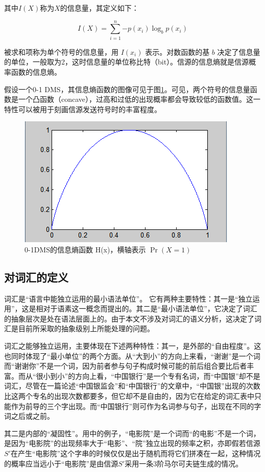 \documentclass[UTF8]{ctexart}
\begin{document}
其中$I(X)$称为$X$的信息量，其定义如下：

\begin{equation}
I(X) = \sum_{i=1}^{n}{-p(x_i) \log_b{p(x_i)}}
\end{equation}

被求和项称为单个符号的信息量，用 $I(x_i)$ 表示。对数函数的基 $b$ 决定了信息量的单位，一般取为2，这时信息量的单位称比特（bit）。信源的信息熵就是信源概率函数的信息熵。

假设一个0-1 DMS，其信息熵函数的图像可见于图\ref{fig_entropy_function}。可见，两个符号的信息量函数是一个凸函数（concave），过高和过低的出现概率都会导致较低的函数值。这一特性可以被用于刻画信源发送符号时的丰富程度。

\begin{figure}
\center
\includegraphics[width=0.6 \textwidth]{entropy_function.png}
\caption{0-1DMS的信息熵函数 H(x)，横轴表示 $\Pr(X=1)$}
\label{fig_entropy_function}
\end{figure}

\subsection{对词汇的定义}
词汇是“语言中能独立运用的最小语法单位”。\cite{HuYushuXianHan} 它有两种主要特性：其一是“独立运用”，这是相对于语素这一概念而提出的。其二是“最小语法单位”，它决定了词汇的抽象层次是处在语法层面上的。由于本文不涉及对词汇的语义分析，这决定了词汇是目前所采取的抽象级别上所能处理的问题。

词汇之能够独立运用，主要体现在下述两种特性：其一，是外部的“自由程度”。这也同时体现了“最小单位”的两个方面。从“大到小”的方向上来看，“谢谢”是一个词而“谢谢你”不是一个词，因为前者参与句子构成时候可能的前后组合要比后者丰富。而从“很小到小”的方向上看，“中国银行”是一个专有名词，而“中国银”却不是词汇，尽管在一篇论述“中国银监会”和“中国银行”的文章中，“中国银”出现的次数比这两个专名的出现次数都要多，但它却不是自由的，因为它在给定的词汇表中只能作为前导的三个字出现。而“中国银行”则可作为名词参与句子，出现在不同的字词之后或之前。

其二是内部的“凝固性”。用\cite{GuSenProgrammer}中的例子，“电影院”是一个词而“的电影”不是一个词，是因为“电影院”的出现频率大于“电影”、“院”独立出现的频率之积，亦即假若信源$S'$在产生“电影院”这个字串的时候仅仅是出于随机而将它们拼凑在一起，这种情况的概率应当远小于“电影院”是由信源$S'$采用一条3阶马尔可夫链生成的情况。
\end{document}
